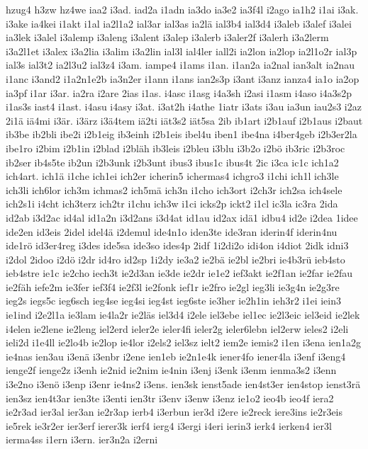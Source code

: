 {hzug4
h3zw
hz4we
iaa2
i3ad.
iad2a
i1adn
ia3do
ia3e2
ia3f4l
i2ago
ia1h2
i1ai
i3ak.
i3ake
ia4kei
i1akt
i1al
ia2l1a2
ial3ar
ial3as
ia2lä
ial3b4
ial3d4
i3aleb
i3alef
i3alei
ia3lek
i3alel
i3alemp
i3aleng
i3alent
i3alep
i3alerb
i3aler2f
i3alerh
i3a2lerm
i3a2l1et
i3alex
i3a2lia
i3alim
i3a2lin
ial3l
ial4ler
iall2i
ia2lon
ia2lop
ia2l1o2r
ial3p
ial3s
ial3t2
ia2l3u2
ial3z4
i3am.
iampe4
i1ams
i1an.
i1an2a
ia2nal
ian3alt
ia2nau
i1anc
i3and2
i1a2n1e2b
ia3n2er
i1ann
i1ans
ian2s3p
i3ant
i3anz
ianza4
ia1o
ia2op
ia3pf
i1ar
i3ar.
ia2ra
i2are
2ias
i1as.
i4asc
i1asg
i4a3sh
i2asi
i1asm
i4aso
i4a3s2p
i1as3s
iast4
i1ast.
i4asu
i4asy
i3at.
i3at2h
i4athe
1iatr
i3ats
i3au
ia3un
iau2s3
i2az
2i1ä
iä4mi
i3är.
i3ärz
i3ä4tem
iä2ti
iät3s2
iät5sa
2ib
ib1art
i2b1auf
i2b1aus
i2baut
ib3be
ib2bli
ibe2i
i2b1eig
ib3einh
i2b1eis
ibel4u
iben1
ibe4na
i4ber4geb
i2b3er2la
ibe1ro
i2bim
i2b1in
i2blad
i2bläh
ib3leis
i2bleu
i3blu
i3b2o
i2bö
ib3ric
i2b3roc
ib2ser
ib4s5te
ib2un
i2b3unk
i2b3unt
ibus3
ibus1c
ibus4t
2ic
i3ca
ic1c
ich1a2
ich4art.
ich1ä
i1che
ich1ei
ich2er
icherin5
ichermas4
ichgro3
i1chi
ich1l
ich3le
ich3li
ich6lor
ich3m
ichmas2
ich5mä
ich3n
i1cho
ich3ort
i2ch3r
ich2sa
ich4sele
ich2s1i
i4cht
ich3terz
ich2tr
i1chu
ich3w
i1ci
icks2p
ickt2
i1cl
ic3la
ic3ra
2ida
id2ab
i3d2ac
id4al
id1a2n
i3d2ans
i3d4at
id1au
id2ax
idä1
idbu4
id2e
i2dea
1idee
ide2en
id3eis
2idel
idel4ä
i2demul
ide4n1o
iden3te
ide3ran
iderin4f
iderin4nu
ide1rö
id3er4reg
i3des
ide5sa
ide3so
ides4p
2idf
1i2di2o
idi4on
i4diot
2idk
idni3
i2dol
2idoo
i2dö
i2dr
id4ro
id2sp
1i2dy
ie3a2
ie2bä
ie2bl
ie2bri
ie4b3rü
ieb4sto
ieb4stre
ie1c
ie2cho
iech3t
ie2d3an
ie3de
ie2dr
ie1e2
ief3akt
ie2f1an
ie2far
ie2fau
ie2fäh
iefe2m
ie3fer
ief3f4
ie2f3l
ie2fonk
ief1r
ie2fro
ie2gl
ieg3li
ie3g4n
ie2g3re
ieg2s
iegs5c
ieg6sch
ieg4se
ieg4si
ieg4st
ieg6ste
ie3her
ie2h1in
ieh3r2
i1ei
iein3
ie1ind
i2e2l1a
ie3lam
ie4la2r
ie2läs
iel3d4
i2ele
iel3ebe
iel1ec
ie2l3eic
iel3eid
ie2lek
i4elen
ie2lene
ie2leng
iel2erd
ieler2e
ieler4fi
ieler2g
ieler6lebn
iel2erw
ieles2
i2eli
ieli2d
i1e4ll
ie2lo4b
ie2lop
ie4lor
i2els2
iel3sz
ielt2
iem2e
iemis2
i1en
i3ena
ien1a2g
ie4nas
ien3au
i3enä
i3enbr
i2ene
ien1eb
ie2n1e4k
iener4fo
iener4la
i3enf
i3eng4
ienge2f
ienge2z
i3enh
ie2nid
ie2nim
ie4nin
i3enj
i3enk
i3enm
ienma3s2
i3enn
i3e2no
i3enö
i3enp
i3enr
ie4ns2
i3ens.
ien3sk
ienst5ade
ien4st3er
ien4stop
ienst3rä
ien3sz
ien4t3ar
ien3te
i3enti
ien3tr
i3env
i3enw
i3enz
ie1o2
ieo4b
ieo4f
iera2
ie2r3ad
ier3al
ier3an
ie2r3ap
ierb4
i3erbun
ier3d
i2ere
ie2reck
iere3ins
ie2r3eis
ie5rek
ie3r2er
ier3erf
ierer3k
ierf4
ierg4
i3ergi
i4eri
ierin3
ierk4
ierken4
ier3l
ierma4ss
i1ern
i3ern.
ier3n2a
i2erni
}
